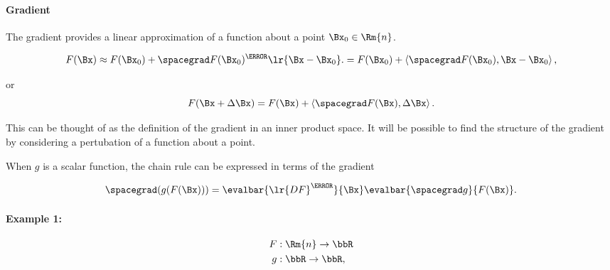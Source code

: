 
\paragraph{Gradient}

The gradient provides a linear approximation of a function about a point \( \Bx_0 \in \Rm{n} \).

\begin{dmath}\label{eqn:jacobianAndHessian:484}
F(\Bx)
\approx F(\Bx_0) + \spacegrad F(\Bx_0)^\T \lr{ \Bx - \Bx_0 }.
=
F(\Bx_0) + \innerproduct{ \spacegrad F(\Bx_0)}{ \Bx - \Bx_0 },
\end{dmath}

or
\begin{equation}\label{eqn:jacobianAndHessian:504}
F(\Bx + \Delta \Bx)
=
F(\Bx) + \innerproduct{ \spacegrad F(\Bx)}{ \Delta \Bx }.
\end{equation}

This can be thought of as the definition of the gradient in an inner product space.  It will be possible to find the structure of the gradient by considering a pertubation of a function about a point.

When \( g \) is a scalar function, the chain rule can be expressed in terms of the gradient

\begin{dmath}\label{eqn:jacobianAndHessian:724}
\spacegrad
(g(F(\Bx)))
=
\evalbar{\lr{
D F
}^\T}{\Bx}
\evalbar{\spacegrad g}{F(\Bx)}.
\end{dmath}


\paragraph{Example 1:}

\begin{dmath}\label{eqn:jacobianAndHessian:524}
\begin{aligned}
F &: \Rm{n} \rightarrow \bbR \\
g &: \bbR \rightarrow \bbR,
\end{aligned}
\end{dmath}

